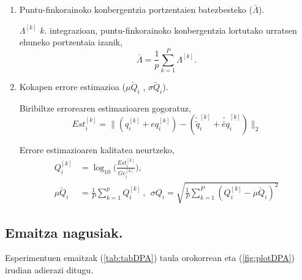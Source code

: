 \begin{enumerate}
\item Puntu-finkorainoko konbergentzia portzentaien batezbesteko  ($\bar{\Lambda}$).
           
$\Lambda^{[k]}$  $k.$ integrazioan, puntu-finkorainoko konbergentzia lortutako urratsen ehuneko portzentaia izanik,           
\begin{equation*}
\bar{\Lambda}= \frac{1}{p}\sum_{k=1}^{P}\Lambda^{[k]}.
\end{equation*}
 
\item Kokapen errore estimazioa ($\bar{\mu Q_i}$ , $\bar{\sigma Q_i}$). 
            
Biribiltze errorearen estimazioaren gogoratuz, 
\begin{equation}
Est_i^{[k]}=\|(q_i^{[k]}+eq_{i}^{[k]})-(\tilde{\tilde{q}}_i^{[k]}+\tilde{\tilde{eq}}_{i}^{[k]})\|_2
\end{equation}
            
Errore estimazioaren kalitatea neurtzeko,
\begin{align} \label{eq:eq_Qi}
Q_i^{[k]} &=\log_{10} \bigg(\frac{Est^{[k]}_i}{Ge^{[k]}_i}\bigg),\\
\bar{\mu Q_i} &={\frac{1}{P}\sum_{k=1}^{p} Q_i^{[k]}} \ , \ \ 
 \sigma Q_i={\sqrt{\frac{1}{P}\sum_{k=1}^{P} (Q_i^{[k]}-\bar{\mu Q_i})^2}}
\end{align}

\end{enumerate} 


\subsection*{Emaitza nagusiak.}

Esperimentuen emaitzak (\ref{tab:tabDPA}) taula orokorrean eta (\ref{fig:plotDPA}) irudian adierazi ditugu. 

